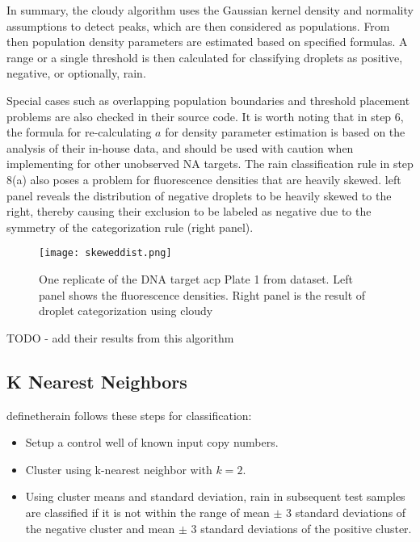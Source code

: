 In summary, the cloudy algorithm uses the Gaussian kernel density and normality assumptions to detect peaks, which are then considered as populations. From then population density parameters are estimated based on specified formulas. A range or a single threshold is then calculated for classifying droplets as positive, negative, or optionally, rain.

Special cases such as overlapping population boundaries and threshold placement problems are also checked in their source code. It is worth noting that in step 6, the formula for re-calculating \(a\) for density parameter estimation is based on the analysis of their in-house data, and should be used with caution when implementing for other unobserved NA targets. The rain classification rule in step 8(a) also poses a problem for fluorescence densities that are heavily skewed.  left panel reveals the distribution of negative droplets to be heavily skewed to the right, thereby causing their exclusion to be labeled as negative due to the symmetry of the categorization rule (right panel).

\begin{figure}[h]
    \centering
    \texttt{[image: skeweddist.png]}
    \caption[Fluorescence distribution of DNA target acp]{One replicate of the DNA target acp Plate 1 from  dataset. Left panel shows the fluorescence densities. Right panel is the result of droplet categorization using cloudy}
        \label{fig:skeweddist}
\end{figure}

TODO - add their results from this algorithm

\subsection{K Nearest Neighbors}
\label{sec:knn}


definetherain follows these steps for classification:
\begin{itemize}
    \item Setup a control well of known input copy numbers. 
    \item Cluster using k-nearest neighbor with \(k=2\). 
    \item Using cluster means and standard deviation, rain in subsequent test samples are classified if it is not within the range of mean \(\pm\) 3 standard deviations of the negative cluster and mean \(\pm\) 3 standard deviations of the positive cluster.
\end{itemize}

